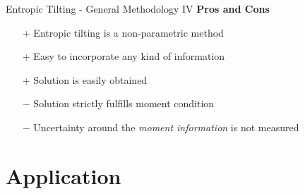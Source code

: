 \documentclass[9pt,xcolor=x11names,compress]{beamer}
\theoremstyle{standard}
\theoremstyle{notes}
\begin{document}
\begin{frame}{Entropic Tilting - General Methodology IV}
\textbf{Pros and Cons}
	\begin{itemize}
			\item[+] Entropic tilting is a non-parametric method
			\item[+] Easy to incorporate any kind of information 
			\item[+] Solution is easily obtained\\
			\vspace{0.5cm}\pause
			\item[$-$] Solution strictly fulfills moment condition
			\item[$-$] Uncertainty around the \textit{moment information} is not measured		
	\end{itemize}
\end{frame}
%
%	

\section{Application}
\end{document}
